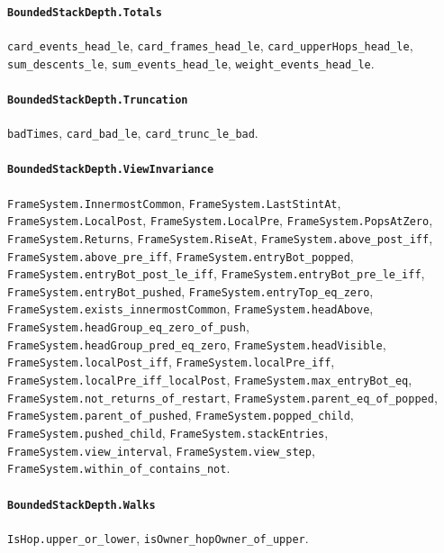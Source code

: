 \paragraph{\texttt{BoundedStackDepth.Totals}}
{\small\raggedright \texttt{card\_events\_head\_le}, \texttt{card\_frames\_head\_le}, \texttt{card\_upperHops\_head\_le}, \texttt{sum\_descents\_le}, \texttt{sum\_events\_head\_le}, \texttt{weight\_events\_head\_le}.\par}

\paragraph{\texttt{BoundedStackDepth.Truncation}}
{\small\raggedright \texttt{badTimes}, \texttt{card\_bad\_le}, \texttt{card\_trunc\_le\_bad}.\par}

\paragraph{\texttt{BoundedStackDepth.ViewInvariance}}
{\small\raggedright \texttt{FrameSystem.InnermostCommon}, \texttt{FrameSystem.LastStintAt}, \texttt{FrameSystem.LocalPost}, \texttt{FrameSystem.LocalPre}, \texttt{FrameSystem.PopsAtZero}, \texttt{FrameSystem.Returns}, \texttt{FrameSystem.RiseAt}, \texttt{FrameSystem.above\_post\_iff}, \texttt{FrameSystem.above\_pre\_iff}, \texttt{FrameSystem.entryBot\_popped}, \texttt{FrameSystem.entryBot\_post\_le\_iff}, \texttt{FrameSystem.entryBot\_pre\_le\_iff}, \texttt{FrameSystem.entryBot\_pushed}, \texttt{FrameSystem.entryTop\_eq\_zero}, \texttt{FrameSystem.exists\_innermostCommon}, \texttt{FrameSystem.headAbove}, \texttt{FrameSystem.headGroup\_eq\_zero\_of\_push}, \texttt{FrameSystem.headGroup\_pred\_eq\_zero}, \texttt{FrameSystem.headVisible}, \texttt{FrameSystem.localPost\_iff}, \texttt{FrameSystem.localPre\_iff}, \texttt{FrameSystem.localPre\_iff\_localPost}, \texttt{FrameSystem.max\_entryBot\_eq}, \texttt{FrameSystem.not\_returns\_of\_restart}, \texttt{FrameSystem.parent\_eq\_of\_popped}, \texttt{FrameSystem.parent\_of\_pushed}, \texttt{FrameSystem.popped\_child}, \texttt{FrameSystem.pushed\_child}, \texttt{FrameSystem.stackEntries}, \texttt{FrameSystem.view\_interval}, \texttt{FrameSystem.view\_step}, \texttt{FrameSystem.within\_of\_contains\_not}.\par}

\paragraph{\texttt{BoundedStackDepth.Walks}}
{\small\raggedright \texttt{IsHop.upper\_or\_lower}, \texttt{isOwner\_hopOwner\_of\_upper}.\par}

